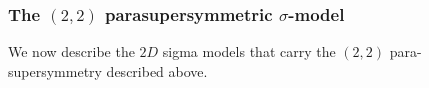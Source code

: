 \documentclass{article}
\newcommand{\p}{\partial}
\newcommand{\tth}{\tl{\theta}}
\def\tl{\tilde}
\theoremstyle{definition}
\theoremstyle{remark}
\begin{document}
%

\subsubsection{The $(2,2)$ parasupersymmetric $\sigma$-model}
We now describe the $2D$ sigma models that carry the $(2,2)$ para-supersymmetry described above.
\end{document}
